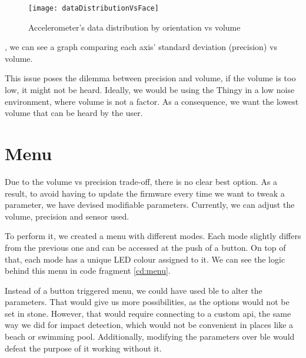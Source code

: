 \begin{figure}[hbt!]
	\centering
	\texttt{[image: dataDistributionVsFace]}
	\caption{Accelerometer's data distribution by orientation vs volume}
	\label{fig:dataDistributionVsFace}
\end{figure}

, we can see a graph comparing each axis' standard deviation (precision)   vs volume.

This issue poses the dilemma between precision and volume, if the volume is too low, it might not be heard. Ideally, we would be using the Thingy in a low noise environment, where volume is not a factor. As a consequence, we want the lowest volume that can be heard by the user.

\section{Menu}

Due to the volume vs precision trade-off, there is no clear best option. As a result, to avoid having to update the firmware every time we want to tweak a parameter, we have devised modifiable parameters. Currently, we can adjust the volume, precision and sensor used.

To perform it, we created a menu with different modes. Each mode slightly differs from the previous one and can be accessed at the push of a button. On top of that, each mode has a unique LED colour assigned to it. We can see the logic behind this menu in code fragment \ref{cd:menu}. 



\makebox[\linewidth][c]{$\smash{\vdots}$}

\makebox[\linewidth][c]{$\smash{\vdots}$}


Instead of a button triggered menu, we could have used \gls{ble} to alter the parameters. That would give us more possibilities, as the options would not be set in stone. However, that would require connecting to a custom \gls{api}, the same way we did for impact detection, which would not be convenient in places like a beach or swimming pool. Additionally, modifying the parameters over \gls{ble} would defeat the purpose of it working without it.

